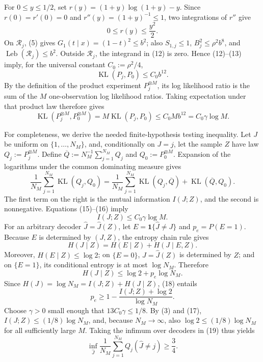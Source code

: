 For \(0\le y\le1/2\), set \(r(y)=(1+y)\log(1+y)-y\).  Since \(r(0)=r'(0)=0\) and \(r''(y)=(1+y)^{-1}\le1\), two integrations of \(r''\) give
\[
 0\le r(y)\le\frac{y^2}{2}.                              \tag{13}
\]
On \(\mathcal R_j\), (5) gives \(G_1(t\mid x)=(1-t)^2\le b^2\); also \(S_{1,j}\le1\), \(B_j^2\le\rho^2b^8\), and \(\operatorname{Leb}(\mathcal R_j)\le b^2\).  Outside \(\mathcal R_j\), the integrand in (12) is zero.  Hence (12)--(13) imply, for the universal constant \(C_0:=\rho^2/4\),
\[
 \operatorname{KL}(P_j,P_0)\le C_0b^{12}.                 \tag{14}
\]
By the definition of the product experiment \(P_j^{\otimes M}\), its log likelihood ratio is the sum of the \(M\) one-observation log likelihood ratios.  Taking expectation under that product law therefore gives
\[
 \operatorname{KL}(P_j^{\otimes M},P_0^{\otimes M})
 =M\operatorname{KL}(P_j,P_0)
 \le C_0Mb^{12}=C_0\gamma\log M.                          \tag{15}
\]

For completeness, we derive the needed finite-hypothesis testing inequality.  Let \(J\) be uniform on \(\{1,\ldots,N_M\}\), and, conditionally on \(J=j\), let the sample \(Z\) have law \(Q_j:=P_j^{\otimes M}\).  Define \(\overline Q:=N_M^{-1}\sum_{j=1}^{N_M}Q_j\) and \(Q_0:=P_0^{\otimes M}\).  Expansion of the logarithms under the common dominating measure gives
\[
 \frac1{N_M}\sum_{j=1}^{N_M}\operatorname{KL}(Q_j,Q_0)
 =\frac1{N_M}\sum_{j=1}^{N_M}\operatorname{KL}(Q_j,\overline Q)
  +\operatorname{KL}(\overline Q,Q_0).                    \tag{16}
\]
The first term on the right is the mutual information \(I(J;Z)\), and the second is nonnegative.  Equations (15)--(16) imply
\[
 I(J;Z)\le C_0\gamma\log M.                              \tag{17}
\]
For an arbitrary decoder \(\widehat J=\widehat J(Z)\), let \(E=\mathbf 1\{\widehat J\ne J\}\) and \(p_e=P(E=1)\).  Because \(E\) is determined by \((J,Z)\), the entropy chain rule gives
\[
 H(J\mid Z)=H(E\mid Z)+H(J\mid E,Z).
\]
Moreover, \(H(E\mid Z)\le\log2\); on \(\{E=0\}\), \(J=\widehat J(Z)\) is determined by \(Z\); and on \(\{E=1\}\), its conditional entropy is at most \(\log N_M\).  Therefore
\[
 H(J\mid Z)\le\log2+p_e\log N_M.                         \tag{18}
\]
Since \(H(J)=\log N_M=I(J;Z)+H(J\mid Z)\), (18) entails
\[
 p_e\ge1-\frac{I(J;Z)+\log2}{\log N_M}.                  \tag{19}
\]
Choose \(\gamma>0\) small enough that \(13C_0\gamma\le1/8\).  By (3) and (17), \(I(J;Z)\le(1/8)\log N_M\), and, because \(N_M\to\infty\), also \(\log2\le(1/8)\log N_M\) for all sufficiently large \(M\).  Taking the infimum over decoders in (19) thus yields
\[
 \inf_{\widehat J}\frac1{N_M}\sum_{j=1}^{N_M}
 Q_j(\widehat J\ne j)\ge\frac34.                         \tag{20}
\]

